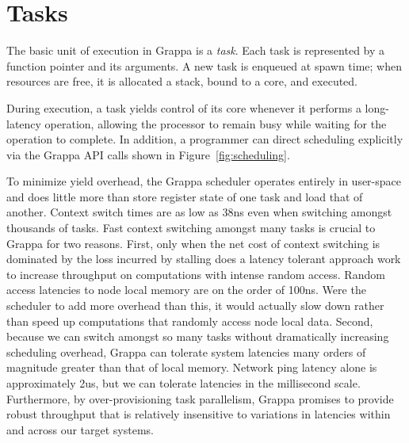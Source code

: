 \section{Tasks}

The basic unit of execution in Grappa is a {\em task}. Each task is
represented by a function pointer and its arguments. A new task is enqueued at
spawn time; when resources are free, it is allocated a stack, bound to a core,
and executed.

During execution, a task yields control of its core whenever it performs
a long-latency operation, allowing the processor to remain busy while
waiting for the operation to complete.  In addition,  a programmer can
direct scheduling explicitly via the Grappa API calls shown
in Figure~\ref{fig:scheduling}.

To minimize yield overhead, the Grappa scheduler operates entirely in
user-space and does little more than store register state of one task and load
that of another. Context switch times are as low as 38ns even when switching
amongst thousands of tasks. Fast context switching amongst many tasks is
crucial to Grappa for two reasons. First, only when the net cost of context
switching is dominated by the loss incurred by stalling does a latency
tolerant approach work to increase throughput on computations with intense
random access. Random access latencies to node local memory are on the order
of 100ns. Were the scheduler to add more overhead than this, it would actually
slow down rather than speed up computations that randomly access node local
data. Second, because we can switch amongst so many tasks without dramatically
increasing scheduling overhead, Grappa can tolerate system latencies many
orders of magnitude greater than that of local memory. Network ping latency
alone is approximately 2us, but we can tolerate latencies in the millisecond
scale. Furthermore, by over-provisioning task parallelism, Grappa promises to
provide robust throughput that is relatively insensitive to variations in
latencies within and across our target systems.

